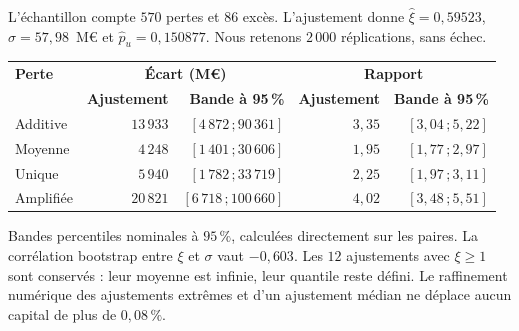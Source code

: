 L'échantillon compte $570$ pertes et $86$ excès. L'ajustement donne $\hat\xi=0{,}59523$, $\hat\sigma=57{,}98$~M\euro{} et $\hat p_u=0{,}150877$. Nous retenons $2\,000$ réplications, sans échec.

\begin{center}\footnotesize
\renewcommand{\arraystretch}{1.15}
\begin{tabular}{@{}lrrrr@{}}
\toprule
\textbf{Perte} & \multicolumn{2}{c}{\textbf{Écart (M\euro)}} & \multicolumn{2}{c}{\textbf{Rapport}} \\
 & \textbf{Ajustement} & \textbf{Bande à 95\,\%} & \textbf{Ajustement} & \textbf{Bande à 95\,\%} \\
\midrule
Additive & $13\,933$ & $[4\,872\,;90\,361]$ & $3{,}35$ & $[3{,}04\,;5{,}22]$ \\
Moyenne & $4\,248$ & $[1\,401\,;30\,606]$ & $1{,}95$ & $[1{,}77\,;2{,}97]$ \\
Unique & $5\,940$ & $[1\,782\,;33\,719]$ & $2{,}25$ & $[1{,}97\,;3{,}11]$ \\
Amplifiée & $20\,821$ & $[6\,718\,;100\,660]$ & $4{,}02$ & $[3{,}48\,;5{,}51]$ \\
\bottomrule
\end{tabular}
\end{center}
\noindent Bandes percentiles nominales à $95\,\%$, calculées directement sur les paires. La corrélation bootstrap entre $\xi$ et $\sigma$ vaut $-0{,}603$. Les $12$ ajustements avec $\xi\geq1$ sont conservés : leur moyenne est infinie, leur quantile reste défini. Le raffinement numérique des ajustements extrêmes et d'un ajustement médian ne déplace aucun capital de plus de $0{,}08\,\%$.
